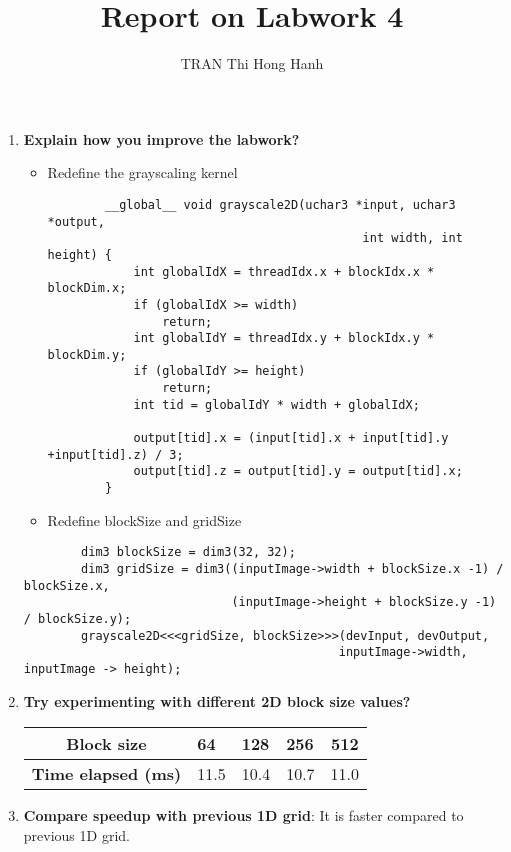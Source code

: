 \documentclass{article}
\title{Report on Labwork 4}
\author{TRAN Thi Hong Hanh}
\begin{document}
\maketitle
\begin{enumerate}
    \item \textbf{Explain how you improve the labwork?}
    \begin{itemize}
        \item Redefine the grayscaling kernel
        \begin{verbatim}
        __global__ void grayscale2D(uchar3 *input, uchar3 *output, 
                                            int width, int height) {
            int globalIdX = threadIdx.x + blockIdx.x * blockDim.x;
            if (globalIdX >= width) 
                return;
            int globalIdY = threadIdx.y + blockIdx.y * blockDim.y;
            if (globalIdY >= height) 
                return;
            int tid = globalIdY * width + globalIdX;
        
            output[tid].x = (input[tid].x + input[tid].y +input[tid].z) / 3;
            output[tid].z = output[tid].y = output[tid].x;
        }
        \end{verbatim}
        \item Redefine blockSize and gridSize
    \end{itemize}
    \begin{verbatim}
        dim3 blockSize = dim3(32, 32);
        dim3 gridSize = dim3((inputImage->width + blockSize.x -1) / blockSize.x,
                             (inputImage->height + blockSize.y -1) / blockSize.y);
        grayscale2D<<<gridSize, blockSize>>>(devInput, devOutput,
                                            inputImage->width, inputImage -> height);
    \end{verbatim}
    
    \item \textbf{Try experimenting with different 2D block size values?}\\
    \begin{table}[]
    \centering
    \begin{tabular}{|l|l|l|l|l|}
    \hline
    \multicolumn{1}{|c|}{\textbf{Block size}} & 64 & 128 & 256 & \multicolumn{1}{c|}{512} \\ \hline
    \textbf{Time elapsed (ms)} & 11.5 & 10.4 & 10.7 & 11.0\\ \hline
    \end{tabular}
    \end{table}
    \newpage
    \item \textbf{Compare speedup with previous 1D grid}: It is faster compared to previous 1D grid.

\end{enumerate}
\end{document}

